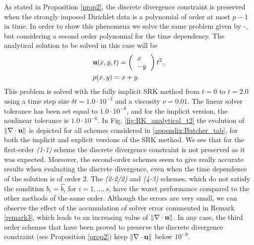 As stated in Proposition \ref{prop2}, the discrete divergence constraint is preserved when the strongly imposed Dirichlet data is a polynomial of order at most $p-1$ in time. In order to show this phenomena we solve the same problem given by -, but considering a second order polynomial for the time dependency. The analytical solution to be solved in this case will be
\begin{align*}
&\u(x,y,t) = \left( \begin{tabular}{l}
$x$\\
$-y$
\end{tabular}\right)t^2,\\
&p(x,y) = x+y.
\end{align*}
This problem is solved with the fully implicit SRK method from $t=0$ to {$t=2.0$} using a time step size { $\delta t=1.0\cdot10^{-2}$} and a viscosity $\nu=0.01$. { The linear solver tolerance has been set equal to $1.0\cdot10^{-8}$, and for the implicit version, the nonlinear tolerance is $1.0\cdot10^{-6}$}. In Fig. \ref{fig:RK_analytical_t2} the evolution of $\|\nabla \cdot {\bf u}\|$ is depicted for all schemes considered in \ref{appendix:Butcher_tab}, for both the implicit and explicit versions of the SRK method. We see that for the first-order \textit{(1-1)} scheme the discrete divergence constraint is not preserved as it was expected. Moreover, the second-order schemes seem to give really accurate results when evaluating the discrete divergence, even when the time dependence of the solution is of order 2. { The \textit{(2-2/2)} and \textit{(4-3)} schemes, which do not satisfy the condition $b_i=\hat{b_i}$ for $i=1,...,s$, have the worst performance compared to the other methods of the same order. Although the errors are very small, we can observe the effect of the accumulation of solver error commented in Remark \ref{remark3}, which leads to an increasing value of $\|\nabla \cdot {\bf u}\|$. In any case, the third order schemes that have been proved to preserve the discrete divergence constraint (see Proposition \ref{prop2}) keep $\|\nabla \cdot {\bf u}\|$ below $10^{-9}$.
}
